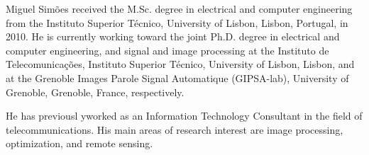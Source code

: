 \documentclass[10pt,twocolumn,twoside]{IEEEtran}
\begin{document}




%

% 


\begin{IEEEbiography}{Miguel Sim\~{o}es}
	received the M.Sc. degree in electrical and computer engineering from the Instituto Superior T\'{e}cnico, University of Lisbon, Lisbon, Portugal, in 2010. He is currently working toward the joint Ph.D. degree in electrical and computer engineering, and signal and image processing at the Instituto de Telecomunica\c{c}\~{o}es, Instituto Superior T\'{e}cnico, University of Lisbon, Lisbon, and at the Grenoble Images Parole Signal Automatique (GIPSA-lab), University of Grenoble, Grenoble, France, respectively.
	
	He has previousl yworked as an Information Technology Consultant in the field of telecommunications. His main areas of research interest are image processing, optimization, and remote sensing.
\end{IEEEbiography}
\end{document}
